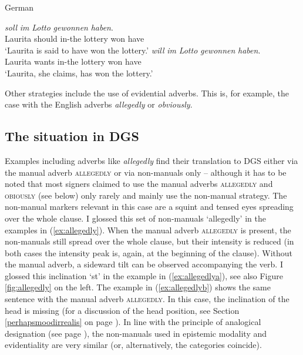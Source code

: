 \begin{exe} 
\ex German \begin{xlist} 
\ex {} {\textit{soll}} {\textit{im}} {\textit{Lotto}} {\textit{gewonnen}} {\textit{haben}.}  \\
{Laurita} {should} {in-the} {lottery} {won} {have}\\
\trans `Laurita is said to have won the lottery.' \label{germanreportativea}
\ex {} {\textit{will}} {\textit{im}} {\textit{Lotto}} {\textit{gewonnen}} {\textit{haben}.}  \\
{Laurita} {wants} {in-the} {lottery} {won} {have}\\
\trans `Laurita, she claims, has won the lottery.' \label{germanreportativeb}
\end{xlist} 
\end{exe}

\noindent Other strategies include the use of evidential adverbs. This is, for example, the case with the English adverbs \textit{allegedly} or \textit{obviously}. 

\subsection{The situation in DGS}
Examples including adverbs like \textit{allegedly} find their translation to DGS either via the manual adverb \textsc{allegedly} or via non-manuals only -- although it has to be noted that most signers claimed to use the manual adverbs \textsc{allegedly} and \textsc{obiously} (see below) only rarely and mainly use the non-manual strategy. The non-manual markers relevant in this case are a squint and tensed eyes spreading over the whole clause. I glossed this set of non-manuals `allegedly' in the examples in (\ref{ex:allegedly}). When the manual adverb \textsc{allegedly} is present, the non-manuals still spread over the whole clause, but their intensity is reduced (in both cases the intensity peak is, again, at the beginning of the clause). Without the manual adverb, a sideward tilt can be observed accompanying the verb. I glossed this inclination `st' in the example in (\ref{ex:allegedlya}), see also Figure \ref{fig:allegedly} on the left. The example in (\ref{ex:allegedlyb}) shows the same sentence with the manual adverb \textsc{allegedly}. In this case, the inclination of the head is missing (for a discussion of the head position, see Section \ref{perhapsmoodirrealis} on page \pageref{perhapsmoodirrealis}). In line with the principle of analogical designation (see page \pageref{analogicaldesignation}), the non-manuals used in epistemic modality and evidentiality are very similar (or, alternatively, the categories coincide).

